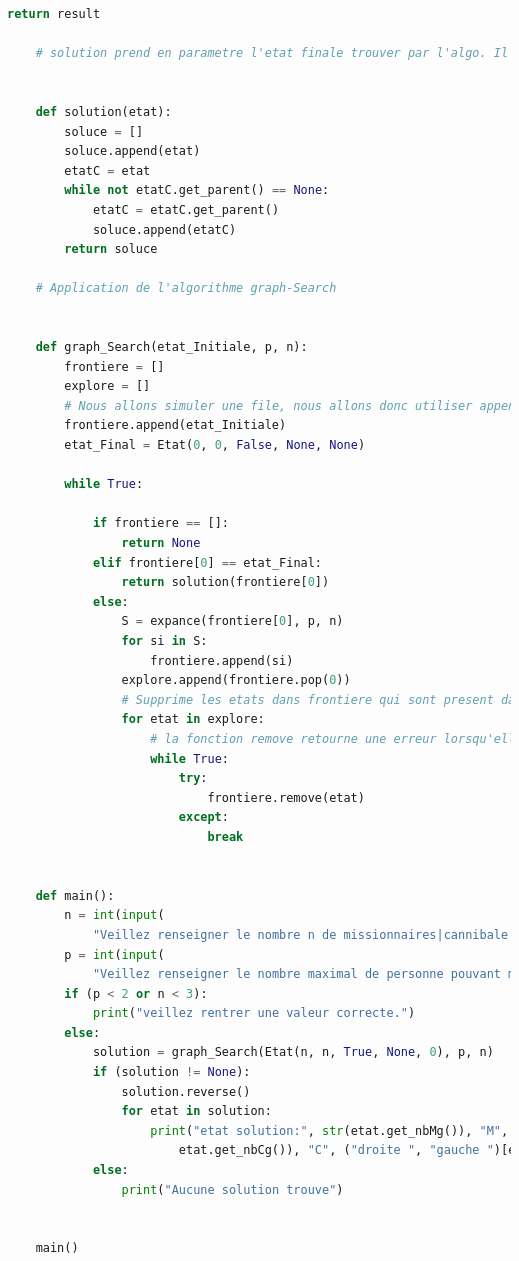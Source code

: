 \documentclass[a4paper, 12pt, french, oneside]{book}
\begin{document}
\begin{lstlisting}[language=Python, caption=Python example]
        return result
    
    # solution prend en parametre l'etat finale trouver par l'algo. Il retournera un liste de tous les parents de la solution. (La racine a la variable parent def a None)
    
    
    def solution(etat):
        soluce = []
        soluce.append(etat)
        etatC = etat
        while not etatC.get_parent() == None:
            etatC = etatC.get_parent()
            soluce.append(etatC)
        return soluce
    
    # Application de l'algorithme graph-Search
    
    
    def graph_Search(etat_Initiale, p, n):
        frontiere = []
        explore = []
        # Nous allons simuler une file, nous allons donc utiliser append qui rajoute l'objet en fin de file et l'etat choisie a expancer sera celui en t^te de file (donc a la position 0)
        frontiere.append(etat_Initiale)
        etat_Final = Etat(0, 0, False, None, None)
    
        while True:
    
            if frontiere == []:
                return None
            elif frontiere[0] == etat_Final:
                return solution(frontiere[0])
            else:
                S = expance(frontiere[0], p, n)
                for si in S:
                    frontiere.append(si)
                explore.append(frontiere.pop(0))
                # Supprime les etats dans frontiere qui sont present dans eplorer (donc les etas deja expance)
                for etat in explore:
                    # la fonction remove retourne une erreur lorsqu'elle ne trouve pas l'element a supprimer dans la file. On va donc capter cette erreur pour eviter de faire "while etat in frontiere". Ce qui nous obligerais a chaque fois de parcourire la file pour s'avoir s'il y a un etat correspondant a "etat".
                    while True:
                        try:
                            frontiere.remove(etat)
                        except:
                            break
    
    
    def main():
        n = int(input(
            "Veillez renseigner le nombre n de missionnaires|cannibale a faires traverser (minimum 3): "))
        p = int(input(
            "Veillez renseigner le nombre maximal de personne pouvant monter sur le bateau (au mininimum 2) : "))
        if (p < 2 or n < 3):
            print("veillez rentrer une valeur correcte.")
        else:
            solution = graph_Search(Etat(n, n, True, None, 0), p, n)
            if (solution != None):
                solution.reverse()
                for etat in solution:
                    print("etat solution:", str(etat.get_nbMg()), "M", str(
                        etat.get_nbCg()), "C", ("droite ", "gauche ")[etat.get_boatPosition()], str(etat.get_cout()))
            else:
                print("Aucune solution trouve")
    
    
    main()
    
\end{lstlisting}

\backmatter
\end{document}
